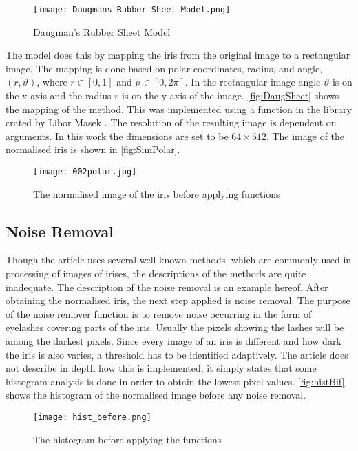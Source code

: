 \begin{figure}[h]
\centering
\texttt{[image: Daugmans-Rubber-Sheet-Model.png]}
\caption{Daugman's Rubber Sheet Model \citep{Misztal2012}}
\label{fig:DaugSheet}
\end{figure}

The model does this by mapping the iris from the original image to a rectangular image. The mapping is done based on polar coordinates, radius, and angle, $(r,\vartheta)$, where $r\in[0,1]$ and $\vartheta\in[0,2\pi]$. In the rectangular image angle $\vartheta$ is on the x-axis and the radius $r$ is on the y-axis of the image. \autoref{fig:DaugSheet} shows the mapping of the method. This was implemented using a function in the library crated by Libor Masek \citep{LiborMasek2003}. The resolution of the resulting image is dependent on arguments. In this work the dimensions are set to be $64\times512$. The image of the normalised iris is shown in \autoref{fig:SimPolar}. 

\begin{figure}[h]
\centering
\texttt{[image: 002polar.jpg]}
\caption{The normalised image of the iris before applying functions}
\label{fig:SimPolar}
\end{figure}

\subsection{Noise Removal}
Though the article uses several well known methods, which are commonly used in processing of images of irises, the descriptions of the methods are quite inadequate. The description of the noise removal is an example hereof. After obtaining the normalised iris, the next step applied is noise removal. The purpose of the noise remover function is to remove noise occurring in the form of eyelashes covering parts of the iris. Usually the pixels showing the lashes will be among the darkest pixels. Since every image of an iris is different and how dark the iris is also varies, a threshold has to be identified adaptively. The article does not describe in depth how this is implemented, it simply states that some histogram analysis is done in order to obtain the lowest pixel values. \autoref{fig:histBif} shows the histogram of the normalised image before any noise removal. 

\begin{figure}[H]
	\centering
	\texttt{[image: hist\_before.png]}
	\caption{The histogram before applying the functions}
	\label{fig:histBif}
\end{figure}

